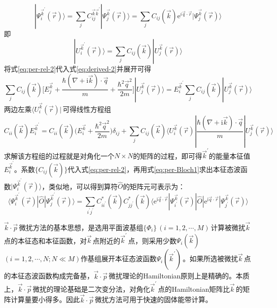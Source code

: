 \begin{equation}
  |\Psi_i^{\vec k^{\prime}}(\vec r)\rangle=\sum_jC_{ij}^{\vec k\vec k^{\prime}}|\Psi_j^{\vec k}(\vec r)\rangle=\sum_jC_{ij}(\vec k)\mathrm{e}^{i\vec q\cdot\vec r}|\Psi_j^{\vec k}(\vec r)\rangle
  \label{eq:per-rel-1}
\end{equation}
即
\begin{equation}
  |U_i^{\vec k^{\prime}}(\vec r)\rangle=\sum_jC_{ij}(\vec k)|U_j^{\vec k}(\vec r)\rangle
  \label{eq:per-rel-2}
\end{equation}
将式\eqref{eq:per-rel-2}代入式\eqref{eq:derived-2}并展开可得
\begin{equation}
 \sum_jC_{ij}(\vec k)\bigg[E_j^{\vec k}+\dfrac{\hbar(\nabla+\mathrm i\vec k)\cdot\vec q}{m}+\dfrac{\hbar^2\vec q^2}{2m}\bigg]|U^{\vec k}_j(\vec r)\rangle=E_i^{\vec k^{\prime}}\sum_jC_{ij}(\vec k)|U^{\vec k}_j(\vec r)\rangle
  \label{eq:per-rel-3}
\end{equation}
两边左乘$\langle U^{\vec k}_i(\vec r)|$\,可得线性方程组
\begin{equation}
  C_{ii}(\vec k)E_i^{\vec k^{\prime}}=C_{ii}(\vec k)\bigg(E_i^{\vec k}+\dfrac{\hbar^2\vec q^2}{2m}\bigg)\delta_{ij}+\sum_jC_{ij}(\vec k)\langle U^{\vec k}_i(\vec r)|\dfrac{\hbar(\nabla+\mathrm i\vec k)\cdot\vec q}{m}|U^{\vec k}_j(\vec r)\rangle
  \label{eq:per-rel-4}
\end{equation}
求解该方程组的过程就是对角化一个$N\times N$的矩阵的过程，即可得$\vec k^{\prime}$的能量本征值$E_i^{\vec k^{\prime}}$。系数$\{C_{ij}(\vec k)\}$代入式\eqref{eq:per-rel-2}，再用式\eqref{eq:per-Bloch1}求出本征态波函数$|\Psi_i^{\vec k^{\prime}}(\vec r)\rangle$，类似地，可以得到算符$\hat O$的矩阵元可表示为：
\begin{equation}
  \langle\Psi_i^{\vec k^{\prime}}(\vec r)|\hat O|\Psi_j^{\vec k^{\prime}}(\vec r)\rangle=\sum_{i^{\prime}j^{\prime}}C^{\ast}_{ii^{\prime}}(\vec k)C^{\ast}_{jj^{\prime}}(\vec k)\langle\mathrm e^{\mathrm i\vec q\cdot\vec r}|\Psi_{i^{\prime}}^{\vec k}(\vec r)|\hat O|\mathrm e^{\mathrm i\vec q\cdot\vec r}|\Psi_{j^{\prime}}^{\vec k}(\vec r)\rangle
  \label{eq:per-oper}
\end{equation}

$\vec k\cdot\vec p$\,微扰方法的基本思想，是选用平面波基组$\{\Phi_i\}$\,$(i=1,2,\cdots, M)$\,计算被微扰$\vec k$\,点的本征态和本征函数，对$\vec k$\,点附近的$\vec k^{\prime}$\,点，则采用少数$\Psi_i(\vec k)$\,$(i=1,2,\cdots,N; N\ll M)$作基组展开本征态波函数$\Psi_i(\vec k^{\prime})$\,。如果所选被微扰$\vec k$\,点的本征态波函数构成完备基，$\vec k\cdot\vec p$\,微扰理论的\textrm{Hamiltonian}原则上是精确的。本质上，$\vec k\cdot\vec p$\,微扰的理论基础是二次变分法，对角化$\vec k^{\prime}$\,点的\textrm{Hamiltonian}矩阵比$\vec k$\,的矩阵计算量要小得多。因此$\vec k\cdot\vec p$\,微扰方法可用于快速的固体能带计算。%

